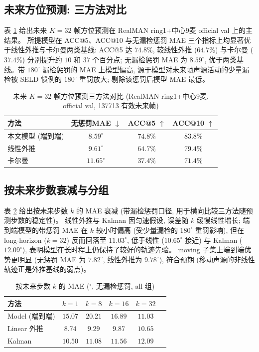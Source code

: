 \documentclass[UTF8,a4paper,11pt]{ctexart}
\begin{document}
\subsection{未来方位预测: 三方法对比}

表 \ref{tab:future} 给出未来 $K{=}32$ 帧方位预测在 RealMAN ring1+中心9麦 official val 上的主结果。
所提模型在 ACC@5、ACC@10 与无漏检惩罚 MAE 三个指标上均显著优于线性外推与卡尔曼两类基线:
ACC@5 达 $74.8\%$, 较线性外推 ($64.7\%$) 与卡尔曼 ($37.4\%$) 分别提升约 $10$ 和 $37$ 个百分点;
无漏检惩罚 MAE 为 $8.59^\circ$, 优于两类基线。带 $180^\circ$ 漏检惩罚的 MAE 上模型偏高,
源于模型对未来帧声源活动的少量漏检被 SELD 惯例的 $180^\circ$ 重罚放大; 剔除该惩罚后模型 MAE 最低。

\begin{table}[h]
  \centering
  \caption{未来 $K{=}32$ 帧方位预测三方法对比 (RealMAN ring1+中心9麦, official val, 137713 有效未来帧)}
  \label{tab:future}
  \begin{tabular}{lccc}
    \toprule
    方法 & 无惩罚MAE $\downarrow$ & ACC@5 $\uparrow$ & ACC@10 $\uparrow$ \\
    \midrule
    本文模型 (端到端) & $\mathbf{8.59^\circ}$ & $\mathbf{74.8\%}$ & $\mathbf{83.8\%}$ \\
    线性外推          & $9.61^\circ$ & $64.7\%$ & $79.4\%$ \\
    卡尔曼            & $11.65^\circ$ & $37.4\%$ & $71.4\%$ \\
    \bottomrule
  \end{tabular}
\end{table}

\subsection{按未来步数衰减与分组}

表 \ref{tab:k_mae} 给出按未来步数 $k$ 的 MAE 衰减 (带漏检惩罚口径, 用于横向比较三方法随预测步数的稳定性)。
线性外推与 Kalman 因匀速假设, 误差随 $k$ 缓慢线性增长; 端到端模型的带惩罚 MAE 在 $k$ 较小时偏高
(受少量漏检的 $180^\circ$ 重罚影响), 但在 long-horizon ($k{=}32$) 反而回落至 $11.03^\circ$,
低于线性 ($10.65^\circ$ 接近) 与 Kalman ($12.09^\circ$), 表明模型在长时程上仍保持了较好的轨迹先验。
moving 子集上端到端优势更明显 (无惩罚 MAE 为 $7.82^\circ$, 线性外推为 $9.78^\circ$),
符合预期 (移动声源的非线性轨迹正是外推基线的弱点)。

\begin{table}[h]
  \centering
  \caption{按未来步数 $k$ 的 MAE ($^\circ$, 无漏检惩罚, all 组)}
  \label{tab:k_mae}
  \begin{tabular}{lccccc}
    \toprule
    方法 & $k{=}1$ & $k{=}8$ & $k{=}16$ & $k{=}32$ \\
    \midrule
    Model (端到端) & $15.07$ & $20.21$ & $16.89$ & $11.03$ \\
    Linear 外推 & $8.74$ & $9.29$ & $9.87$ & $10.65$ \\
    Kalman & $10.50$ & $11.08$ & $11.56$ & $12.09$ \\
    \bottomrule
  \end{tabular}
\end{table}
\end{document}
